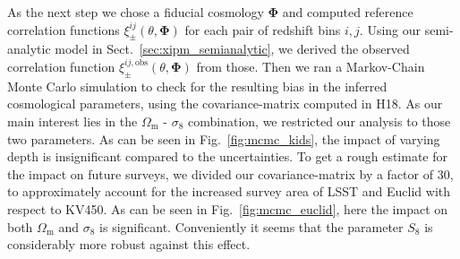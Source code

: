 \documentclass[referee]{aa} %
\renewcommand{\[}{\begin{equation}}
\renewcommand{\]}{\end{equation}}
\renewcommand{\rm}{\mathrm}
\def\b#1{\bm{#1}}
\begin{document}
As the next step we chose a fiducial cosmology $\b \Phi$ and computed reference correlation functions $\xi_\pm^{ij}(\theta,\b\Phi)$ for each pair of redshift bins $i,j$. Using our semi-analytic model in Sect.~\ref{sec:xipm_semianalytic}, we derived the observed correlation function $\xi_\pm^{ij,\rm{obs}}(\theta,\b\Phi)$ from those. Then we ran a Markov-Chain Monte Carlo simulation to check for the resulting bias in the inferred cosmological parameters, using the covariance-matrix computed in H18. As our main interest lies in the $\Omega_{\rm m}$ - $\sigma_8$ combination, we restricted our analysis to those two parameters. As can be seen in Fig.~\ref{fig:mcmc_kids}, the impact of varying depth is insignificant compared to the uncertainties. To get a rough estimate for the impact on future surveys, we divided our covariance-matrix by a factor of 30, to approximately account for the increased survey area of LSST and Euclid with respect to KV450. As can be seen in Fig.~\ref{fig:mcmc_euclid}, here the impact on both $\Omega_{\rm m}$ and $\sigma_8$ is significant. Conveniently it seems that the parameter $S_8$ is considerably more robust against this effect.
\end{document}
